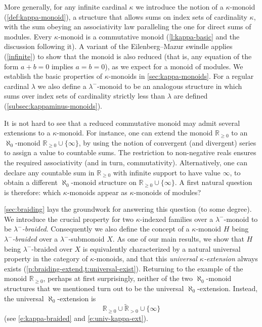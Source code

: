 \documentclass[a4paper,11pt,oneside]{amsart}
\theoremstyle{remark}
\newcommand{\bR}{\mathbb R}
\begin{document}
More generally, for any infinite cardinal $\kappa$ we introduce the notion of a $\kappa$-monoid (\cref{def:kappa-monoid}), a structure that allows sums on index sets of cardinality $\kappa$, with the sum obeying an associativity law paralleling the one for direct sums of modules.
Every $\kappa$-monoid is a commutative monoid (\cref{l:kappa-basic} and the discussion following it).
A variant of the Eilenberg--Mazur swindle applies (\cref{infinite}) to show that the monoid is also reduced (that is, any equation of the form $a+b=0$ implies $a=b=0$), as we expect for a monoid of modules.
We establish the basic properties of $\kappa$-monoids in \cref{sec:kappa-monoids}.
For a regular cardinal $\lambda$ we also define a $\lambda^-$-monoid to be an analogous structure in which sums over index sets of cardinality strictly less than $\lambda$ are defined (\cref{subsec:kappaminus-monoids}).

It is not hard to see that a reduced commutative monoid may admit several extensions to a $\kappa$-monoid.
For instance, one can extend the monoid $\bR_{\ge 0}$ to an $\aleph_0$-monoid $\bR_{\ge 0} \cup \{\infty\}$, by using the notion of convergent (and divergent) series to assign a value to countable sums.
The restriction to non-negative reals ensures the required associativity (and in turn, commutativity).
Alternatively, one can declare any countable sum in $\bR_{\ge 0}$ with infinite support to have value $\infty$, to obtain a different $\aleph_0$-monoid structure on $\bR_{\ge 0} \cup \{\infty\}$.
A first natural question is therefore:
which $\kappa$-monoids appear as $\kappa$-monoids of modules?

\cref{sec:braiding} lays the groundwork for answering this question (to some degree).
We introduce the crucial property for two $\kappa$-indexed families over a $\lambda^-$-monoid to be \emph{$\lambda^-$-braided}.
Consequently we also define the concept of a $\kappa$-monoid $H$ being \emph{$\lambda^-$-braided} over a $\lambda^-$-submonoid $X$.
As one of our main results, we show that $H$ being $\lambda^-$-braided over $X$ is equivalently characterized by a natural universal property in the category of $\kappa$-monoids, and that this \emph{universal $\kappa$-extension} always exists (\cref{p:braiding-extend,t:universal-exist}).
Returning to the example of the monoid $\bR_{\ge 0}$, perhaps at first surprisingly, neither of the two $\aleph_0$-monoid structures that we mentioned turn out to be the universal $\aleph_0$-extension.
Instead, the universal $\aleph_0$-extension is
\[
  \bR_{\ge 0} \cup \widetilde{\bR}_{> 0} \cup \{\infty\}
\]
(see \cref{e:kappa-braided} and \ref{e:univ-kappa-ext}).
\end{document}
